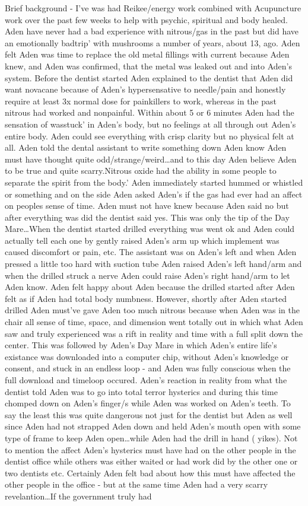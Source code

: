 \documentclass[12pt]{book}
\begin{document}
Brief background - I've was had Reikee/energy work combined with Acupuncture work over the past few weeks to help with psychic, spiritual and body healed. Aden have never had a bad experience with nitrous/gas in the past but did have an emotionally badtrip' with mushrooms a number of years, about 13, ago. Aden felt Aden was time to replace the old metal fillings with current because Aden knew, and Aden was confirmed, that the metal was leaked out and into Aden's system. Before the dentist started Aden explained to the dentist that Aden did want novacane because of Aden's hypersensative to needle/pain and honestly require at least 3x normal dose for painkillers to work, whereas in the past nitrous had worked and nonpainful. Within about 5 or 6 minutes Aden had the sensation of wasstuck' in Aden's body, but no feelings at all through out Aden's entire body. Aden could see everything with crisp clarity but no physical felt at all. Aden told the dental assistant to write something down Aden know Aden must have thought quite odd/strange/weird\ldots and to this day Aden believe Aden to be true and quite scarry.Nitrous oxide had the ability in some people to separate the spirit from the body.' Aden immediately started hummed or whistled or something and on the side Aden asked Aden's if the gas had ever had an affect on peoples sense of time. Aden must not have knew because Aden said no but after everything was did the dentist said yes. This was only the tip of the Day Mare\ldots When the dentist started drilled everything was went ok and Aden could actually tell each one by gently raised Aden's arm up which implement was caused discomfort or pain, etc. The assistant was on Aden's left and when Aden pressed a little too hard with suction tube Aden raised Aden's left hand/arm and when the drilled struck a nerve Aden could raise Aden's right hand/arm to let Aden know. Aden felt happy about Aden because the drilled started after Aden felt as if Aden had total body numbness. However, shortly after Aden started drilled Aden must've gave Aden too much nitrous because when Aden was in the chair all sense of time, space, and dimension went totally out in which what Aden saw and truly experienced was a rift in reality and time with a full split down the center. This was followed by Aden's Day Mare in which Aden's entire life's existance was downloaded into a computer chip, without Aden's knowledge or consent, and stuck in an endless loop - and Aden was fully conscious when the full download and timeloop occured. Aden's reaction in reality from what the dentist told Aden was to go into total terror hysterics and during this time chomped down on Aden's finger/s while Aden was worked on Aden's teeth. To say the least this was quite dangerous not just for the dentist but Aden as well since Aden had not strapped Aden down and held Aden's mouth open with some type of frame to keep Aden open\ldots while Aden had the drill in hand ( yikes). Not to mention the affect Aden's hysterics must have had on the other people in the dentist office while others was either waited or had work did by the other one or two dentists etc. Certainly Aden felt bad about how this must have affected the other people in the office - but at the same time Aden had a very scarry revelantion\ldots If the government truly had 
\end{document}
